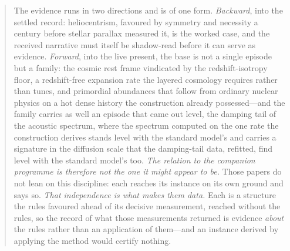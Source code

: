 \documentclass[11pt,a4paper]{article}
\begin{document}
\begin{abstract}
The evidence runs in two directions and is of one form. \emph{Backward}, into the settled record: heliocentrism, favoured by symmetry and necessity a
century before stellar parallax measured it, is the worked case, and the received narrative must itself be shadow-read before it can serve as
evidence. \emph{Forward}, into the live present, the base is not a single episode but a family: the cosmic rest frame vindicated by the
redshift-isotropy floor, a redshift-free expansion rate the layered cosmology requires rather than tunes, and primordial abundances that
follow from ordinary nuclear physics on a hot dense history the construction already possessed---and the family carries as
well an episode that came out level, the damping tail of the acoustic spectrum, where the spectrum computed on the one rate the
construction derives stands level with the standard model's and carries a signature in the diffusion scale that the
damping-tail data, refitted, find level with the standard model's too. \emph{The relation to the companion programme is
therefore not the one it might appear to be.} Those papers do not lean on this discipline: each reaches its instance on its own ground and says so.
\emph{That independence is what makes them data.} Each is a structure the rules favoured ahead of its decisive measurement, reached without the rules,
so the record of what those measurements returned is evidence \emph{about} the rules rather than an application of them---and an instance derived by
applying the method would certify nothing.


\end{abstract}
\end{document}
